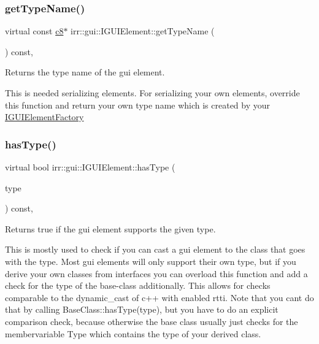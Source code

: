 \subsubsection{\texorpdfstring{get\+Type\+Name()}{getTypeName()}}
{\footnotesize\ttfamily virtual const \hyperlink{namespaceirr_a9395eaea339bcb546b319e9c96bf7410}{c8}$\ast$ irr\+::gui\+::\+I\+G\+U\+I\+Element\+::get\+Type\+Name (\begin{DoxyParamCaption}{ }\end{DoxyParamCaption}) const\hspace{0.3cm}{\ttfamily [inline]}, {\ttfamily [virtual]}}



Returns the type name of the gui element. 

This is needed serializing elements. For serializing your own elements, override this function and return your own type name which is created by your \hyperlink{classirr_1_1gui_1_1IGUIElementFactory}{I\+G\+U\+I\+Element\+Factory} \mbox{\label{classirr_1_1gui_1_1IGUIElement_a3c9f0356f89f4906c7bf5a302e57f01d}} 
\subsubsection{\texorpdfstring{has\+Type()}{hasType()}}
{\footnotesize\ttfamily virtual bool irr\+::gui\+::\+I\+G\+U\+I\+Element\+::has\+Type (\begin{DoxyParamCaption}\item[{\hyperlink{namespaceirr_1_1gui_ae4d66df0ecf4117cdbcf9f22404bd254}{E\+G\+U\+I\+\_\+\+E\+L\+E\+M\+E\+N\+T\+\_\+\+T\+Y\+PE}}]{type }\end{DoxyParamCaption}) const\hspace{0.3cm}{\ttfamily [inline]}, {\ttfamily [virtual]}}



Returns true if the gui element supports the given type. 

This is mostly used to check if you can cast a gui element to the class that goes with the type. Most gui elements will only support their own type, but if you derive your own classes from interfaces you can overload this function and add a check for the type of the base-\/class additionally. This allows for checks comparable to the dynamic\+\_\+cast of c++ with enabled rtti. Note that you can\textquotesingle{}t do that by calling Base\+Class\+::has\+Type(type), but you have to do an explicit comparison check, because otherwise the base class usually just checks for the membervariable Type which contains the type of your derived class. \mbox{\label{classirr_1_1gui_1_1IGUIElement_add00898b0ee96565f55b1b47efaceec6}} 
